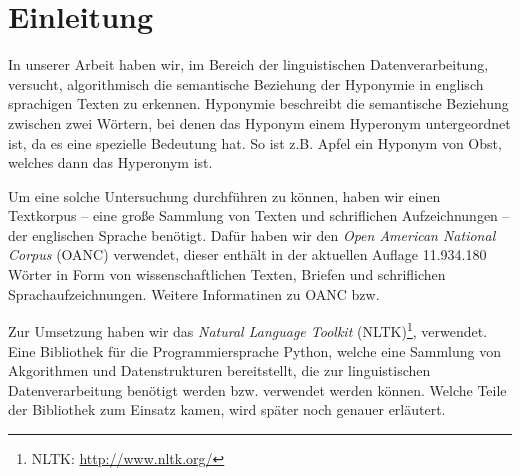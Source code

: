 \section{Einleitung}

In unserer Arbeit haben wir, im Bereich der linguistischen
Datenverarbeitung, versucht, algorithmisch die semantische
Beziehung der Hyponymie in englisch sprachigen Texten zu erkennen.
Hyponymie beschreibt die semantische Beziehung zwischen zwei Wörtern,
bei denen das Hyponym einem Hyperonym untergeordnet ist, da es eine
spezielle Bedeutung hat. So ist z.B. Apfel ein Hyponym von Obst,
welches dann das Hyperonym ist. \cite{bib:Glueck2005}

Um eine solche Untersuchung durchführen zu können, haben wir einen
Textkorpus -- eine große Sammlung von Texten und schriflichen
Aufzeichnungen -- der englischen Sprache benötigt. Dafür haben wir den
\textit{Open American National Corpus} (OANC) verwendet, dieser
enthält in der aktuellen Auflage 11.934.180 Wörter in Form von
wissenschaftlichen Texten, Briefen und schriflichen
Sprachaufzeichnungen. Weitere Informatinen zu OANC bzw. \cite{bib:Ide2002}

Zur Umsetzung haben wir das \textit{Natural Language Toolkit}
(NLTK)\footnote{NLTK: \url{http://www.nltk.org/}},
verwendet. Eine Bibliothek für die Programmiersprache Python, welche
eine Sammlung von Akgorithmen und Datenstrukturen bereitstellt, die zur
linguistischen Datenverarbeitung benötigt werden bzw. verwendet werden
können. \cite{bib:Bird2006} Welche Teile der Bibliothek zum Einsatz
kamen, wird später noch genauer erläutert.